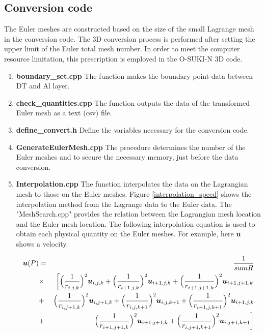 %

\subsection{Conversion code}
The Euler meshes are constructed based on the size of the small Lagrange mesh in the conversion code. The 3D conversion process is performed after setting the upper limit of the Euler total mesh number. In order to meet the computer resource limitation, this prescription is employed in the O-SUKI-N 3D code. 

\begin{enumerate}
\item{\bf boundary\_set.cpp}
The function makes the boundary point data between DT and Al layer. 
\item{\bf check\_quantities.cpp}
The function outputs the data of the transformed Euler mesh as a text (csv) file. 
\item{\bf define\_convert.h}
Define the variables necessary for the conversion code.

\item{\bf GenerateEulerMesh.cpp}
The procedure determines the number of the Euler meshes and to secure the necessary memory, just before the data conversion.
\item{\bf Interpolation.cpp}
The function interpolates the data on the Lagrangian mesh to those on the Euler meshes. Figure \ref{interpolation_speed} shows the interpolation method from the Lagrange data to the Euler data. The "MeshSearch.cpp" provides the relation between the Lagrangian mesh location and the Euler mesh location. The following interpolation equation is used to obtain each physical quantity on the Euler meshes. For example, here $\bm u$ shows a velocity. 

\begin{eqnarray}\label{eq:interpolation}
	\bm u(P)&=&\frac{1}{sumR}\nonumber\\		
		&\times&\left[\Bigl(\frac{1}{r_{i,j,k}}\Bigr)^2\bm u_{i,j,k}+\Bigl(\frac{1}{r_{i+1,j,k}}\Bigr)^2\bm u_{i+1,j,k}+\Bigl(\frac{1}{r_{i+1,j+1,k}}\Bigr)^2\bm u_{i+1,j+1,k}\right.\nonumber\\
		&+&\Bigl(\frac{1}{r_{i,j+1,k}}\Bigr)^2\bm u_{i,j+1,k}+\Bigl(\frac{1}{r_{i,j,k+1}}\Bigr)^2\bm u_{i,j,k+1}+\Bigl(\frac{1}{r_{i+1,j,k+1}}\Bigr)^2\bm u_{i+1,j,k}\nonumber\\
		&+&\left.\Bigl(\frac{1}{r_{i+1,j+1,k}}\Bigr)^2\bm u_{i+1,j+1,k}+\Bigl(\frac{1}{r_{i,j+1,k+1}}\Bigr)^2\bm u_{i,j+1,k+1}\right]
	\end{eqnarray}


\end{enumerate}
